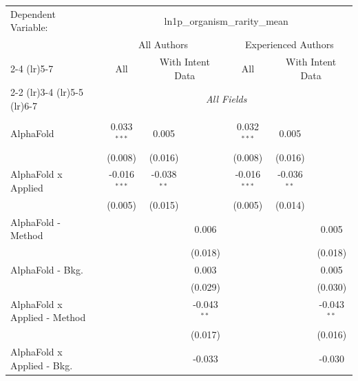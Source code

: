 \begingroup
\centering
\begin{tabular}{lcccccc}
   \tabularnewline \midrule \midrule
   Dependent Variable: & \multicolumn{6}{c}{ln1p\_organism\_rarity\_mean}\\
 & \multicolumn{3}{c}{All Authors} & \multicolumn{3}{c}{Experienced Authors} \\
\cmidrule(lr){2-4} \cmidrule(lr){5-7}
 & \multicolumn{1}{c}{All} & \multicolumn{2}{c}{With Intent Data} & \multicolumn{1}{c}{All} & \multicolumn{2}{c}{With Intent Data} \\
\cmidrule(lr){2-2} \cmidrule(lr){3-4} \cmidrule(lr){5-5} \cmidrule(lr){6-7}
 & \multicolumn{6}{c}{\textit{All Fields}} \\ \\
   AlphaFold                      & 0.033$^{***}$  & 0.005         &               & 0.032$^{***}$  & 0.005         &   \\   
                                  & (0.008)        & (0.016)       &               & (0.008)        & (0.016)       &   \\   
   AlphaFold x Applied            & -0.016$^{***}$ & -0.038$^{**}$ &               & -0.016$^{***}$ & -0.036$^{**}$ &   \\   
                                  & (0.005)        & (0.015)       &               & (0.005)        & (0.014)       &   \\   
   AlphaFold - Method             &                &               & 0.006         &                &               & 0.005\\   
                                  &                &               & (0.018)       &                &               & (0.018)\\   
   AlphaFold - Bkg.               &                &               & 0.003         &                &               & 0.005\\   
                                  &                &               & (0.029)       &                &               & (0.030)\\   
   AlphaFold x Applied - Method   &                &               & -0.043$^{**}$ &                &               & -0.043$^{**}$\\   
                                  &                &               & (0.017)       &                &               & (0.016)\\   
   AlphaFold x Applied - Bkg.     &                &               & -0.033        &                &               & -0.030\\   

\end{tabular}
